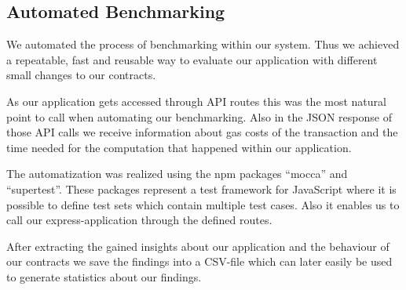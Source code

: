 \subsection{Automated Benchmarking}
We automated the process of benchmarking within our system. Thus we achieved a repeatable, fast and reusable way to evaluate our application with different small changes to our contracts.

As our application gets accessed through API routes this was the most natural point to call when automating our benchmarking. Also in the JSON response of those API calls we receive information about gas costs of the transaction and the time needed for the computation that happened within our application.

The automatization was realized using the npm packages ``mocca'' and ``supertest''. These packages represent a test framework for JavaScript where it is possible to define test sets which contain multiple test cases. Also it enables us to call our express-application through the defined routes.

After extracting the gained insights about our application and the behaviour of our contracts we save the findings into a CSV-file which can later easily be used to generate statistics about our findings.
